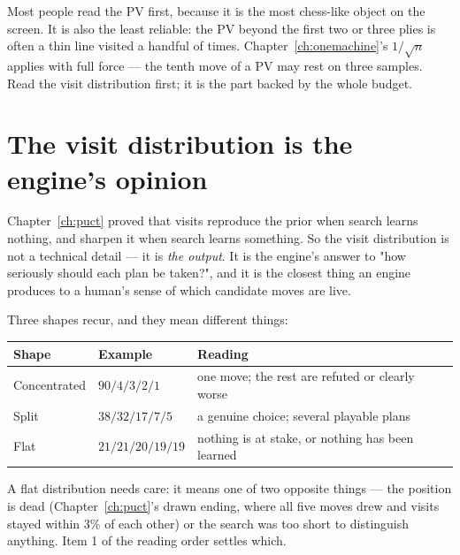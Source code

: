 \begin{pitfall}
Most people read the PV first, because it is the most chess-like object on the screen. It is
also the least reliable: the PV beyond the first two or three plies is often a thin line
visited a handful of times. Chapter~\ref{ch:onemachine}'s $1/\sqrt{n}$ applies with full
force --- the tenth move of a PV may rest on three samples. Read the visit distribution first;
it is the part backed by the whole budget.
\end{pitfall}

\section{The visit distribution is the engine's opinion}

Chapter~\ref{ch:puct} proved that visits reproduce the prior when search learns nothing, and
sharpen it when search learns something. So the visit distribution is not a technical
detail --- it is \emph{the output}. It is the engine's answer to "how seriously should each
plan be taken?", and it is the closest thing an engine produces to a human's sense of which
candidate moves are live.

Three shapes recur, and they mean different things:

\begin{center}
\begin{tabular}{@{}lll@{}}
\toprule
Shape & Example & Reading \\
\midrule
Concentrated & $90/4/3/2/1$ & one move; the rest are refuted or clearly worse \\
Split & $38/32/17/7/5$ & a genuine choice; several playable plans \\
Flat & $21/21/20/19/19$ & nothing is at stake, or nothing has been learned \\
\bottomrule
\end{tabular}
\end{center}

A flat distribution needs care: it means one of two opposite things --- the position is dead
(Chapter~\ref{ch:puct}'s drawn ending, where all five moves drew and visits stayed within
$3\%$ of each other) or the search was too short to distinguish anything. Item 1 of the
reading order settles which.

